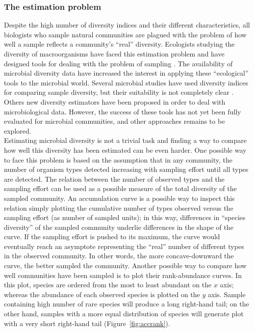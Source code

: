 \subsubsection{The estimation problem}
Despite the high number of diversity indices and their different characteristics, all biologists who sample natural communities are plagued with the problem of how well a sample reflects a community's ``real'' diversity. Ecologists studying the diversity of macroorganisms have faced this estimation problem and have designed tools for dealing with the problem of sampling \cite{heck1975explicit, magurran1988ecological, colwell1994estimating}. The availability of microbial diversity data have increased the interest in applying these ``ecological'' tools to the microbial world. Several microbial studies have used diversity indices for comparing sample diversity, but their suitability is not completely clear \cite{mcmurdie2014waste}. Others new diversity estimators have been proposed in order to deal with microbiological data. However, the success of these tools has not yet been fully evaluated for microbial communities, and other approaches remains to be explored.\\
Estimating microbial diversity is not a trivial task and finding a way to compare how well this diversity has been estimated can be even harder. One possible way to face this problem is based on the assumption that in any community, the number of organism types detected increasing with sampling effort until all types are detected. The relation between the number of observed types and the sampling effort can be used as a possible measure of the total diversity of the sampled community. An accumulation curve is a possible way to inspect this relation simply plotting the cumulative number of types observed versus the sampling effort (as number of sampled units); in this way, differences in ``species diversity'' of the sampled community underlie differences in the shape of the curve. If the sampling effort is pushed to its maximum, the curve would eventually reach an asymptote representing the ``real'' number of different types in the observed community. In other words, the more concave-downward the curve, the better sampled the community. Another possible way to compare how well communities have been sampled is to plot their rank-abundance curves. In this plot, species are ordered from the most to least abundant on the $x$ axis; whereas the abundance of each observed species is plotted on the $y$ axis. Sample containing high number of rare species will produce a long right-hand tail; on the other hand, samples with a more equal distribution of species will generate plot with a very short right-hand tail (Figure~\ref{fig:accrank}).\\
